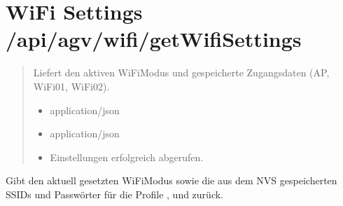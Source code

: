 \documentclass[letterpaper,10pt,english]{sphinxmanual}
\begin{document}
\section{WiFi Settings \textendash{} /api/agv/wifi/getWifiSettings}
\label{\detokenize{agv_rest_api_wifi:wifi-settings-api-agv-wifi-getwifisettings}}\label{\detokenize{agv_rest_api_wifi:get-api-agv-wifi-settings}}

\begin{fulllineitems}
\label{\detokenize{agv_rest_api_wifi:get--api-agv-wifi-getWifiSettings}}
\pysigstartsignatures
\pysigline
{}
\pysigstopsignatures\begin{quote}\begin{description}
\sphinxAtStartPar
Liefert den aktiven WiFi\sphinxhyphen{}Modus und gespeicherte Zugangsdaten (AP, WiFi\sphinxhyphen{}01, WiFi\sphinxhyphen{}02).

\begin{itemize}
\item {} 
\sphinxAtStartPar
{} \textendash{} application/json

\end{itemize}

\begin{itemize}
\item {} 
\sphinxAtStartPar
{} \textendash{} application/json

\end{itemize}

\begin{itemize}
\item {} 
\sphinxAtStartPar
{} \textendash{} Einstellungen erfolgreich abgerufen.

\end{itemize}

\end{description}\end{quote}

\end{fulllineitems}


\sphinxAtStartPar
{}
Gibt den aktuell gesetzten WiFi\sphinxhyphen{}Modus sowie die aus dem NVS gespeicherten SSIDs und Passwörter
für die Profile ,  und  zurück.
\end{document}
